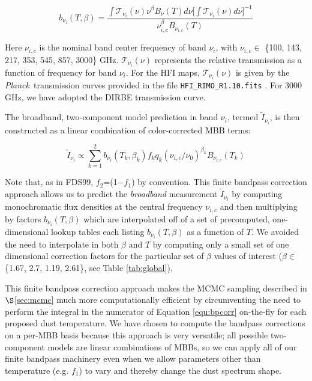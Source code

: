 \documentclass{emulateapj}
\newcommand{\PLANCK}{{\it Planck}}
\begin{document}
\begin{equation} \label{equ:bpcorr}
b_{\nu_i}(T, \beta) = \frac{\int \mathcal{T}_{\nu_i}(\nu)\nu^{\beta}B_{\nu}(T) d\nu \bigg[\int \mathcal{T}_{\nu_i}(\nu) d\nu\bigg]^{-1}}{\nu_{i,c}^{\beta}B_{\nu_{i,c}}(T)}
\end{equation}




Here $\nu_{i,c}$ is the nominal band center frequency of band $\nu_i$,  with 
$\nu_{i,c} \in$ \{100, 143, 217, 353, 545, 857, 3000\} GHz. 
$\mathcal{T}_{\nu_i}(\nu)$ represents the relative transmission as a function 
of frequency for band $\nu_i$. For the HFI maps, $\mathcal{T}_{\nu_i}(\nu)$ is 
given by the \PLANCK~transmission curves provided in the file 
\verb|HFI_RIMO_R1.10.fits| \citep{planckresponse}. For 3000 GHz, we have 
adopted the DIRBE transmission curve.

The broadband, two-component model prediction in band $\nu_i$, termed 
$\tilde{I}_{\nu_i}$, is then constructed as a linear combination of 
color-corrected MBB terms:

\begin{equation} \label{equ:broadband}
\tilde{I}_{\nu_i} \propto \sum_{k=1}^{2} b_{\nu_i}(T_k, \beta_k) f_k q_k (\nu_{i,c}/\nu_0)^{\beta_k} B_{\nu_{i,c}}(T_k)
\end{equation}

Note that, as in FDS99, $f_2$=(1$-$$f_1$) by convention. This finite bandpass 
correction approach allows us to predict the \textit{broadband} measurement 
$\tilde{I}_{\nu_i}$ by computing monochromatic flux densities at the central 
frequency $\nu_{i,c}$ and then multiplying by factors $b_{\nu_i}(T, \beta)$ 
which are interpolated off of a set of precomputed, one-dimensional lookup 
tables each listing $b_{\nu_i}(T, \beta)$ as a function of $T$. We avoided the 
need to interpolate in both $\beta$ and $T$ by computing only a small set of 
one dimensional correction factors for the particular set of $\beta$ values of 
interest ($\beta \in$ \{1.67, 2.7, 1.19, 2.61\}, see Table \ref{tab:global}).

This finite bandpass correction approach makes the MCMC sampling described in 
$\S$\ref{sec:mcmc} much more computationally efficient by circumventing the 
need to perform the integral in the numerator of Equation \ref{equ:bpcorr} 
on-the-fly for each proposed dust temperature. We have chosen to compute the 
bandpass corrections on a per-MBB basis because this approach is very 
versatile; all possible two-component models are linear combinations of MBBs, 
so we can apply all of our finite bandpass machinery even when we allow 
parameters other than temperature (e.g. $f_1$) to vary and thereby change the 
dust spectrum shape.
\end{document}
